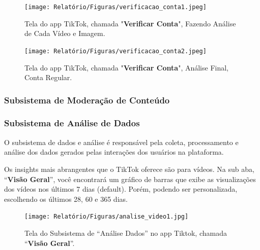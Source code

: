 \begin{figure}[H]
    \centering
    \begin{minipage}{0.45\textwidth}
        \centering
        \texttt{[image: Relatório/Figuras/verificacao\_conta1.jpeg]}
        \caption{Tela do app TikTok, chamada "\textbf{Verificar Conta}", Fazendo Análise de Cada Vídeo e Imagem.}
        \label{fig:promover_publicacao1}
    \end{minipage}\hfill
    \begin{minipage}{0.45\textwidth}
        \centering
        \texttt{[image: Relatório/Figuras/verificacao\_conta2.jpeg]}
        \caption{Tela do app TikTok, chamada "\textbf{Verificar Conta}", Análise Final, Conta Regular.}
        \label{fig:promover_publicacao2}
    \end{minipage}
\end{figure}













\newpage
\subsubsection{Subsistema de Moderação de Conteúdo}










\newpage
\subsubsection{Subsistema de Análise de Dados}

O subsistema de dados e análise é responsável pela coleta, processamento e análise dos dados gerados pelas interações dos usuários na plataforma.\vskip0.3cm


Os insights mais abrangentes que o TikTok oferece são para vídeos. Na sub aba, “\textbf{Visão Geral}”, você encontrará um gráfico de barras que exibe as visualizações dos vídeos nos últimos 7 dias (default). Porém, podendo ser personalizada, escolhendo os últimos 28, 60 e 365 dias.


\begin{figure}[H]
    \centering
    \texttt{[image: Relatório/Figuras/analise\_video1.jpg]}
    \caption{Tela do Subsistema de “Análise Dados” no app Tiktok, chamada “\textbf{Visão Geral}”.}
    \label{fig:enter-label2} 
\end{figure}

